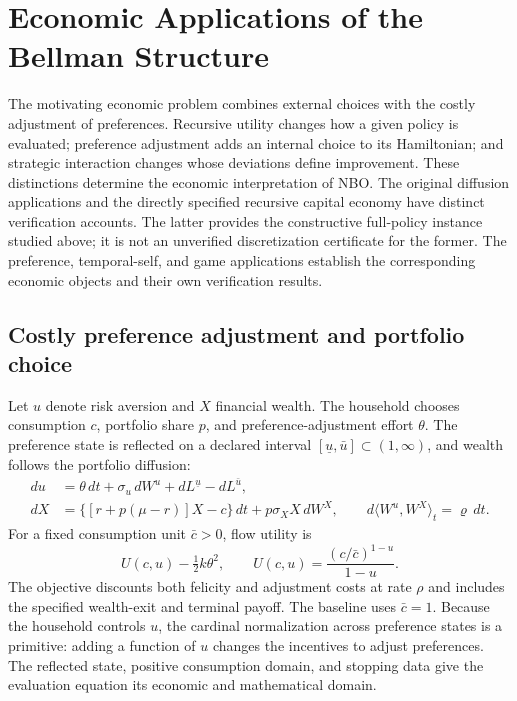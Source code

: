 \documentclass[ecta,nameyear,draft]{econsocart}
\theoremstyle{definition}
\theoremstyle{remark}
\begin{document}
\section{Economic Applications of the Bellman Structure}\label{sec:economic-scope}
The motivating economic problem combines external choices with the costly adjustment of preferences. Recursive utility changes how a given policy is evaluated; preference adjustment adds an internal choice to its Hamiltonian; and strategic interaction changes whose deviations define improvement. These distinctions determine the economic interpretation of NBO. The original diffusion applications and the directly specified recursive capital economy have distinct verification accounts. The latter provides the constructive full-policy instance studied above; it is not an unverified discretization certificate for the former. The preference, temporal-self, and game applications establish the corresponding economic objects and their own verification results.

\subsection{Costly preference adjustment and portfolio choice}
Let $u$ denote risk aversion and $X$ financial wealth. The household chooses consumption $c$, portfolio share $p$, and preference-adjustment effort $\theta$. The preference state is reflected on a declared interval $[\underline u,\bar u]\subset(1,\infty)$, and wealth follows the portfolio diffusion:
\begin{align}
 du&=\theta\,dt+\sigma_u\,dW^u+dL^{\underline u}-dL^{\bar u},\nonumber\\
 dX&=\{[r+p(\mu-r)]X-c\}\,dt+p\sigma_X X\,dW^X,
 \qquad d\langle W^u,W^X\rangle_t=\varrho\,dt.\label{eq:scope-preferences}
\end{align}
For a fixed consumption unit $\bar c>0$, flow utility is
\[
 U(c,u)-\tfrac12k\theta^2,
 \qquad U(c,u)=\frac{(c/\bar c)^{1-u}}{1-u}.
\]
The objective discounts both felicity and adjustment costs at rate $\rho$ and includes the specified wealth-exit and terminal payoff. The baseline uses $\bar c=1$. Because the household controls $u$, the cardinal normalization across preference states is a primitive: adding a function of $u$ changes the incentives to adjust preferences. The reflected state, positive consumption domain, and stopping data give the evaluation equation its economic and mathematical domain.
\end{document}
